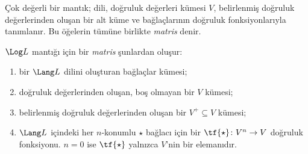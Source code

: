 



Çok değerli bir mantık; dili, doğruluk değerleri kümesi $V$, belirlenmiş
doğruluk değerlerinden oluşan bir alt küme ve bağlaçlarının doğruluk
fonksiyonlarıyla tanımlanır. Bu öğelerin tümüne birlikte \emph{matris} denir.

\begin{defn}[Matris]
$\Log L$ mantığı için bir \emph{matris} şunlardan oluşur:
\begin{enumerate}
\item bir $\Lang L$ dilini oluşturan bağlaçlar kümesi;
\item doğruluk değerlerinden oluşan, boş olmayan bir $V$ kümesi;
\item belirlenmiş doğruluk değerlerinden oluşan bir $V^+\subseteq V$ kümesi;
\item $\Lang L$ içindeki her $n$-konumlu $\star$ bağlacı için bir
  $\tf{\star}\colon V^n\to V$ doğruluk fonksiyonu. $n=0$ ise
  $\tf{\star}$ yalnızca $V$'nin bir elemanıdır.
\end{enumerate}
\end{defn}

